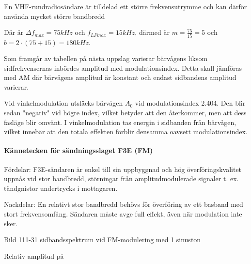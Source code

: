 \documentclass[a4paper,twoside,twocolumn,openright]{book}
\begin{document}
En VHF-rundradiosändare är tilldelad ett större frekvensutrymme och kan därför använda
mycket större bandbredd

Där är $\Delta f_{max} = 75 kHz$ och $f_{LFmax} =15 kHz$, därmed är $m = \frac{75}{15} = 5$
och $b = 2 \cdot (75 + 15) = 180 kHz$.

Som framgår av tabellen på nästa uppslag varierar bärvågens liksom sidfrekvensernas
inbördes amplitud med modulationsindex. Detta skall jämföras med AM där bärvågens amplitud
är konstant och endast sidbandens amplitud varierar.

Vid vinkelmodulation utsläcks bärvågen $A_0$ vid modulationsindex 2.404. Den blir sedan
"negativ" vid högre index, vilket betyder att den återkommer, men att dess fasläge blir
omvänt. I vinkelmodulation tas energin i sidbanden från bärvågen, vilket innebär att
den totala effekten förblir densamma oavsett modulationsindex.

\paragraph{Kännetecken för sändningsslaget F3E (FM)}

Fördelar: F3E-sändaren är enkel till sin uppbyggnad och hög överföringskvalitet
uppnås vid stor bandbredd, störningar från amplitudmodulerade signaler t. ex. tändgnistor
undertrycks i mottagaren.

Nackdelar: En relativt stor bandbredd behövs för överföring av ett basband med
stort frekvensomfång. Sändaren måste avge full effekt, även när modulation inte sker.

Bild 111-31 sidbandsspektrum vid FM-modulering med 1 sinuston

\begin{turn}{90}Relativ amplitud på\end{turn}
\end{document}

